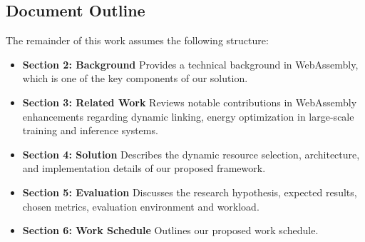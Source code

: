 \subsection{Document Outline}

The remainder of this work assumes the following structure:

\begin{itemize}    
    \item \textbf{Section 2: Background} Provides a technical background in WebAssembly, which is one of the key components of our solution.

    \item \textbf{Section 3: Related Work} Reviews notable contributions in
WebAssembly enhancements regarding dynamic linking, energy optimization in large-scale training and inference systems.

    \item \textbf{Section 4: Solution} Describes the dynamic resource selection, architecture, and implementation details of our proposed framework.

    \item \textbf{Section 5: Evaluation} Discusses the research hypothesis, expected results, chosen metrics, evaluation environment and workload.

    \item \textbf{Section 6: Work Schedule} Outlines our proposed work schedule.
\end{itemize}


\pagebreak






